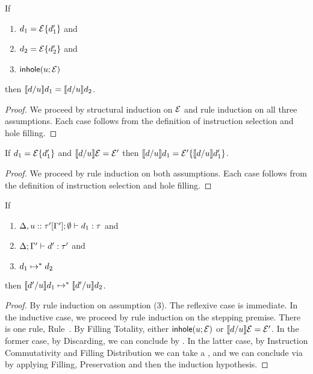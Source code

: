 \begin{lem}[Discarding] If 
	\begin{enumerate}[nolistsep]
	\item $d_1=\mathcal{E}\{d_1'\}$ and 
	\item $d_2=\mathcal{E}\{d_2'\}$ and 
	\item $\mathsf{inhole}(u; \mathcal{E})$
	\end{enumerate}

	then $\llbracket d / u\rrbracket d_1 = \llbracket d / u\rrbracket d_2$.
\end{lem}
\begin{proof} We proceed by structural induction on $\mathcal{E}$ and rule induction on all three assumptions. Each case follows from the definition of instruction selection and hole filling. \end{proof}


\begin{lem} If 
	$d_1=\mathcal{E}\{d_1'\}$ and $\llbracket d / u\rrbracket \mathcal{E}=\mathcal{E}'$ then $\llbracket d / u\rrbracket d_1=\mathcal{E}'\{\llbracket d / u\rrbracket d_1'\}$.
\end{lem}
\begin{proof} We proceed by rule induction on both assumptions. Each case follows from the definition of instruction selection and hole filling. \end{proof}


\begin{thm}[Commutativity]
  If 
  \begin{enumerate}[nolistsep]
  \item $\Delta, u :: \tau'[\Gamma']; \emptyset \vdash d_1 : \tau$ and 
  \item $\Delta; \Gamma' \vdash d' : \tau'$ and 
  \item $d_1 \mapsto^* d_2$
\end{enumerate}

  then $\llbracket d' / u\rrbracket d_1 \mapsto^* \llbracket d' / u\rrbracket d_2$.
\end{thm}
\begin{proof}
By rule induction on assumption (3). The reflexive case is immediate. In the inductive case, we proceed by rule induction on the stepping premise. There is one rule, Rule~. By Filling Totality, either $\mathsf{inhole}(u; \mathcal{E})$ or $\llbracket d / u\rrbracket \mathcal{E} = \mathcal{E}'$. In the former case, by Discarding, we can conclude by . In the latter case, by Instruction Commutativity and Filling Distribution we can take a , and we can conclude via  by applying Filling, Preservation and then the induction hypothesis.
\end{proof}